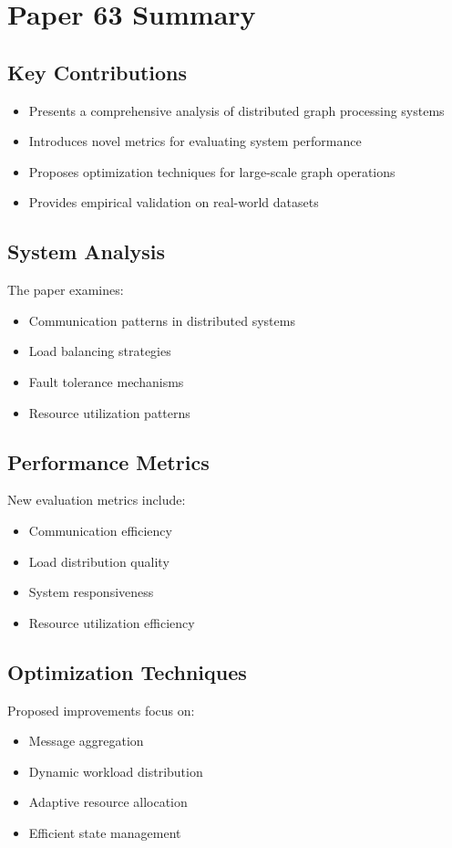 \section{Paper 63 Summary}

\subsection{Key Contributions}
\begin{itemize}
    \item Presents a comprehensive analysis of distributed graph processing systems
    \item Introduces novel metrics for evaluating system performance
    \item Proposes optimization techniques for large-scale graph operations
    \item Provides empirical validation on real-world datasets
\end{itemize}

\subsection{System Analysis}
The paper examines:
\begin{itemize}
    \item Communication patterns in distributed systems
    \item Load balancing strategies
    \item Fault tolerance mechanisms
    \item Resource utilization patterns
\end{itemize}

\subsection{Performance Metrics}
New evaluation metrics include:
\begin{itemize}
    \item Communication efficiency
    \item Load distribution quality
    \item System responsiveness
    \item Resource utilization efficiency
\end{itemize}

\subsection{Optimization Techniques}
Proposed improvements focus on:
\begin{itemize}
    \item Message aggregation
    \item Dynamic workload distribution
    \item Adaptive resource allocation
    \item Efficient state management
\end{itemize}


